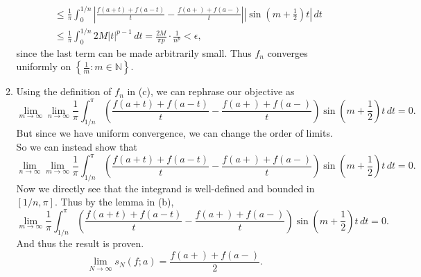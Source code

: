 \documentclass[12pt]{report}
\newcommand{\num}[1]{\item[\textbf{\sffamily #1}]}
\newcommand{\ds}{\displaystyle}
\newcommand{\abs}[1]{\left| #1 \right|}
\newcommand{\paren}[1]{\left( #1 \right)}
\newcommand{\ra}{\rightarrow}
\newcommand{\N}{\mathbb{N}}
\renewcommand{\d}[1]{\,d{#1}}
\begin{document}
\begin{enumerate}
\begin{enumerate}
\[\begin{aligned}
                 & \qquad \leq \frac{1}{\pi} \int_0^{1/n} \abs{\frac{f(a+t) + f(a-t)}{t} - \frac{f(a+) + f(a-)}{t}} \abs{\sin\paren{m + \frac{1}{2}}t} \d{t}    \\
                 & \qquad \leq \frac{1}{\pi} \int_0^{1/n} 2M \abs{t}^{p-1} \d{t} = \frac{2M}{\pi p} \cdot \frac{1}{n^p} < \epsilon,
            \end{aligned}
        \]
        since the last term can be made arbitrarily small. Thus \(f_n\) converges uniformly on \(\ds \left\{\frac{1}{m} : m \in \N\right\}\).

        \num{(d)} Using the definition of \(f_n\) in {\sffamily (c)}, we can rephrase our objective as
        \[
            \lim_{m \ra \infty} \lim_{n \ra \infty} \frac{1}{\pi} \int_{1/n}^\pi \left(\frac{f(a+t) + f(a-t)}{t} - \frac{f(a+) + f(a-)}{t}\right)\sin\paren{m + \frac{1}{2}}t \d{t} = 0.
        \]
        But since we have uniform convergence, we can change the order of limits. So we can instead show that
        \[
            \lim_{n \ra \infty} \lim_{m \ra \infty} \frac{1}{\pi} \int_{1/n}^\pi \left(\frac{f(a+t) + f(a-t)}{t} - \frac{f(a+) + f(a-)}{t}\right)\sin\paren{m + \frac{1}{2}}t \d{t} = 0.
        \]
        Now we directly see that the integrand is well-defined and bounded in \([1/n, \pi]\). Thus by the lemma in {\sffamily (b)},
        \[
            \lim_{m \ra \infty} \frac{1}{\pi} \int_{1/n}^\pi \left(\frac{f(a+t) + f(a-t)}{t} - \frac{f(a+) + f(a-)}{t}\right)\sin\paren{m + \frac{1}{2}}t \d{t} = 0.
        \]
        And thus the result is proven.
        \[
            \lim_{N \ra\infty} s_N(f; a) = \frac{f(a+) + f(a-)}{2}.
        \]

    \end{enumerate}



\end{enumerate}
\end{document}
